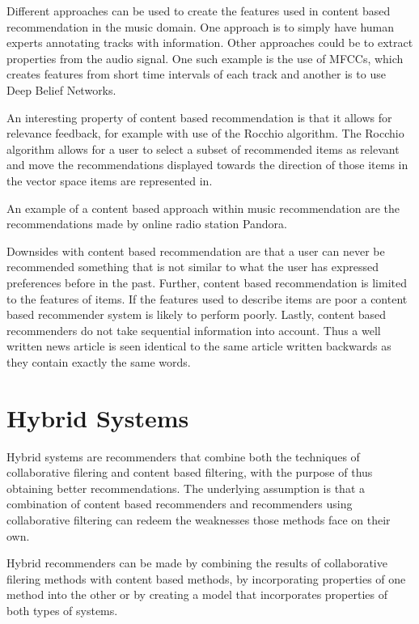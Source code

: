 \documentclass[a4paper,11pt]{kth-mag}
\begin{document}
Different approaches can be used to create the features used in content based recommendation in the music domain. One approach is to simply have human experts annotating tracks with information\cite{musicGenome}\cite{tzanetakis2002musical}. Other approaches could be to extract properties from the audio signal. One such example is the use of MFCCs, which creates features from short time intervals of each track\cite{logan2000mel} and another is to use Deep Belief Networks\cite{hamel2010learning}.

An interesting property of content based recommendation is that it allows for relevance feedback, for example with use of the Rocchio algorithm. The Rocchio algorithm allows for a user to select a subset of recommended items as relevant and move the recommendations displayed towards the direction of those items in the vector space items are represented in\cite{pazzani2007content}.

An example of a content based approach within music recommendation are the recommendations made by online radio station Pandora. 

Downsides with content based recommendation are that a user can never be recommended something that is not similar to what the user has expressed preferences before in the past. Further, content based recommendation is limited to the features of items. If the features used to describe items are poor a content based recommender system is likely to perform poorly. Lastly, content based recommenders do not take sequential information into account. Thus a well written news article is seen identical to the same article written backwards as they contain exactly the same words\cite{adomavicius2005toward}.

\section{Hybrid Systems}
Hybrid systems are recommenders that combine both the techniques of collaborative filering and content based filtering, with the purpose of thus obtaining better recommendations. The underlying assumption is that a combination of content based recommenders and recommenders using collaborative filtering can redeem the weaknesses those methods face on their own\cite{gunawardana2009unified}. 

Hybrid recommenders can be made by combining the results of collaborative filering methods with content based methods, by incorporating properties of one method into the other or by creating a model that incorporates properties of both types of systems\cite{adomavicius2005toward}.
\end{document}
